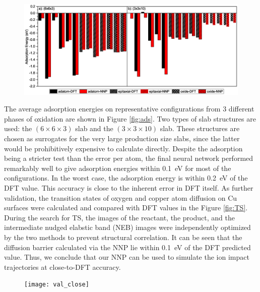 \message{ !name(paper.tex)}\documentclass[manuscript=cmatex]{achemso}
\begin{document}
\begin{figure}[h]
  \centering
  \includegraphics[width=\textwidth]{val_ads}
  \caption[Comparison of adsorption energies calculated using DFT and NNP]{}
  \label{fig:val_ads}
\end{figure}

The average adsorption energies on representative configurations from 3 different phases of oxidation are shown in Figure \ref{fig:ads}. Two types of slab structures are used: the $(6\times6\times3)$ slab and the $(3\times3\times10)$ slab. These structures are chosen as surrogates for the very large production size slabs, since the latter would be prohibitively expensive to calculate directly. Despite the adsorption being a stricter test than the error per atom, the final neural network performed remarkably well to give adsorption energies within \SI{0.1}{eV} for most of the configurations. In the worst case, the adsorption energy is within \SI{0.2}{eV} of the DFT value. This accuracy is close to the inherent error in DFT itself. As further validation, the transition states of oxygen and copper atom diffusion on Cu surfaces were calculated and compared with DFT values in the Figure \ref{fig:TS}. During the search for TS, the images of the reactant, the product, and the intermediate nudged elabstic band (NEB) images were independently optimized by the two methods to prevent structural correlation. It can be seen that the diffusion barrier calculated via the NNP lie within \SI{0.1}{eV} of the DFT predicted value. Thus, we conclude that our NNP can be used to simulate the ion impact trajectories at close-to-DFT accuracy.
\begin{figure}[h]
  \centering
  \texttt{[image: val\_close]}
  \caption[Comparison of the PES calculated using DFT and NNP on simulated impact event]{}
  \label{fig:val_close}
\end{figure}


\end{document}

